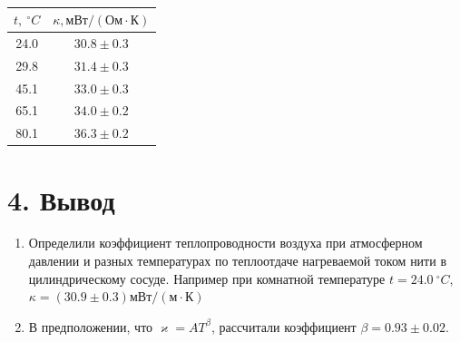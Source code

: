 \documentclass[a4paper,12pt]{article} %
\begin{document}
	
\begin{table}[]
\begin{minipage}{\linewidth}
\centering
\begin{tabular}{|c|c|}
\hline
$t, \ ^{\circ}C$ & $\kappa, \text{мВт}/(\text{Ом} \cdot   \text{К})$ \\ \hline
24.0             & $30.8 \pm 0.3$                     \\ \hline
29.8             & $31.4 \pm 0.3$                       \\ \hline
45.1             & $33.0 \pm 0.3$                      \\ \hline
65.1             & $34.0 \pm 0.2$                       \\ \hline
80.1             & $36.3 \pm 0.2$                       \\ \hline
\end{tabular}
\caption{}
\end{minipage}
\end{table}


\section*{4. Вывод}



\begin{enumerate}
\item
	Определили коэффициент теплопроводности воздуха при атмосферном давлении и разных температурах по теплоотдаче нагреваемой током нити в цилиндрическому сосуде. Например при комнатной температуре $t = 24.0 \ ^{\circ} C$, $\kappa = (30.9 \pm 0.3) \text{мВт}/(\text{м} \cdot \text{К})$
	
\item
	В предположении, что $\varkappa = AT^\beta$, рассчитали коэффициент $\beta = 0.93 \pm 0.02$.

\end{enumerate}
\end{document}
